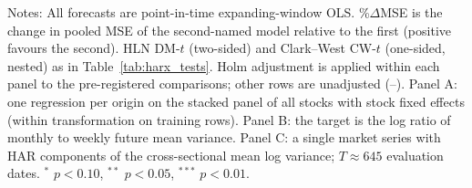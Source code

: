 \begin{table}[htbp]
\begin{tablenotes}\small
\item Notes: All forecasts are point-in-time expanding-window OLS. \%$\Delta$MSE is the change in pooled MSE of the second-named model relative to the first (positive favours the second). HLN DM-$t$ (two-sided) and Clark--West CW-$t$ (one-sided, nested) as in Table~\ref{tab:harx_tests}. Holm adjustment is applied within each panel to the pre-registered comparisons; other rows are unadjusted (--). Panel A: one regression per origin on the stacked panel of all stocks with stock fixed effects (within transformation on training rows). Panel B: the target is the log ratio of monthly to weekly future mean variance. Panel C: a single market series with HAR components of the cross-sectional mean log variance; $T\approx645$ evaluation dates. $^{*}$ $p<0.10$, $^{**}$ $p<0.05$, $^{***}$ $p<0.01$.
\end{tablenotes}
\end{table}
